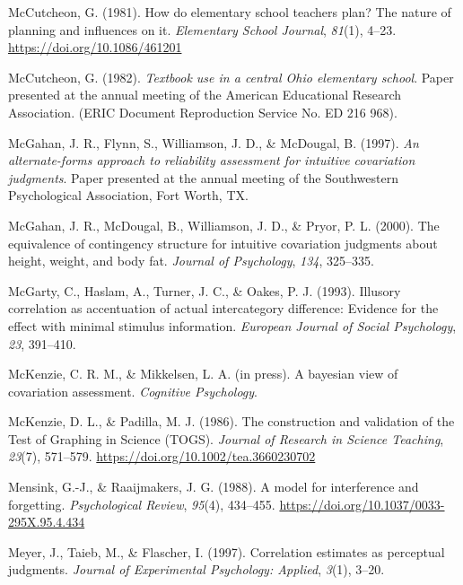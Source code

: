 \documentclass[11pt]{umnthesis}
\newlength{\cslhangindent}
\newenvironment{CSLReferences}[2] %
 {%
  \setlength{\parindent}{0pt}
  \ifodd #1 \everypar{\setlength{\hangindent}{\cslhangindent}}\ignorespaces\fi
  \ifnum #2 > 0
  \setlength{\parskip}{#2\baselineskip}
  \fi
 }%
 {}
\begin{document}
\begin{CSLReferences}{1}{0}
\leavevmode{}%
McCutcheon, G. (1981). How do elementary school teachers plan? The nature of planning and influences on it. \emph{Elementary School Journal}, \emph{81}(1), 4--23. \url{https://doi.org/10.1086/461201}

\leavevmode{}%
McCutcheon, G. (1982). \emph{Textbook use in a central {O}hio elementary school}. {Paper presented at the annual meeting of the American Educational Research Association. (ERIC Document Reproduction Service No. ED 216 968)}.

\leavevmode{}%
McGahan, J. R., Flynn, S., Williamson, J. D., \& McDougal, B. (1997). \emph{An alternate-forms approach to reliability assessment for intuitive covariation judgments}. Paper presented at the annual meeting of the {Southwestern Psychological Association}, {Fort Worth, TX}.

\leavevmode{}%
McGahan, J. R., McDougal, B., Williamson, J. D., \& Pryor, P. L. (2000). The equivalence of contingency structure for intuitive covariation judgments about height, weight, and body fat. \emph{Journal of Psychology}, \emph{134}, 325--335.

\leavevmode{}%
McGarty, C., Haslam, A., Turner, J. C., \& Oakes, P. J. (1993). Illusory correlation as accentuation of actual intercategory difference: Evidence for the effect with minimal stimulus information. \emph{European Journal of Social Psychology}, \emph{23}, 391--410.

\leavevmode{}%
McKenzie, C. R. M., \& Mikkelsen, L. A. (in press). A bayesian view of covariation assessment. \emph{Cognitive Psychology}.

\leavevmode{}%
McKenzie, D. L., \& Padilla, M. J. (1986). The construction and validation of the {Test of Graphing in Science (TOGS)}. \emph{Journal of Research in Science Teaching}, \emph{23}(7), 571--579. \url{https://doi.org/10.1002/tea.3660230702}

\leavevmode{}%
Mensink, G.-J., \& Raaijmakers, J. G. (1988). A model for interference and forgetting. \emph{Psychological Review}, \emph{95}(4), 434--455. \url{https://doi.org/10.1037/0033-295X.95.4.434}

\leavevmode{}%
Meyer, J., Taieb, M., \& Flascher, I. (1997). Correlation estimates as perceptual judgments. \emph{Journal of Experimental Psychology: Applied}, \emph{3}(1), 3--20.


\end{CSLReferences}
\end{document}

